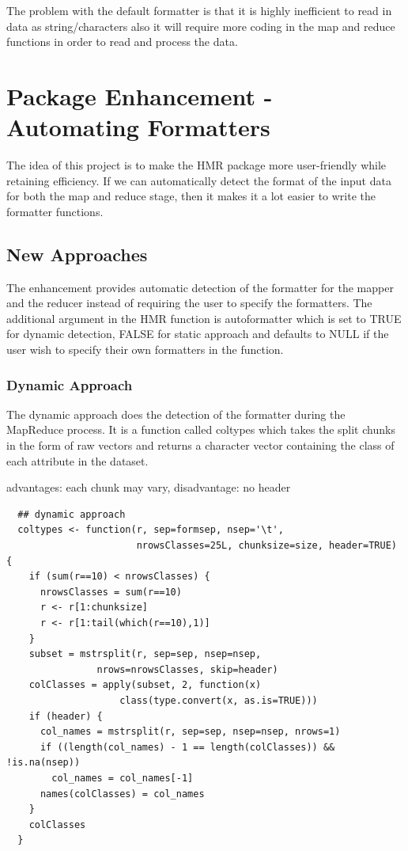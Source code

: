\documentclass[11pt]{book}
\begin{document}
The problem with the default formatter is that it is highly inefficient to read in data as string/characters also it will require more coding in the map and reduce functions in order to read and process the data. 



\chapter{Package Enhancement - Automating Formatters}

The idea of this project is to make the HMR package more user-friendly while retaining efficiency. If we can automatically detect the format of the input data for both the map and reduce stage, then it makes it a lot easier to write the formatter functions. 

\section{New Approaches}

The enhancement provides automatic detection of the formatter for the mapper and the reducer instead of requiring the user to specify the formatters. The additional argument in the HMR function is autoformatter which is set to TRUE for dynamic detection, FALSE for static approach and defaults to NULL if the user wish to specify their own formatters in the function.

\subsection{Dynamic Approach}

The dynamic approach does the detection of the formatter during the MapReduce process. It is a function called coltypes which takes the split chunks in the form of raw vectors and returns a character vector containing the class of each attribute in the dataset. 

advantages: each chunk may vary, 
disadvantage: no header

\begin{verbatim}
  ## dynamic approach
  coltypes <- function(r, sep=formsep, nsep='\t', 
                       nrowsClasses=25L, chunksize=size, header=TRUE) {
    if (sum(r==10) < nrowsClasses) {
      nrowsClasses = sum(r==10)
      r <- r[1:chunksize]
      r <- r[1:tail(which(r==10),1)]
    }
    subset = mstrsplit(r, sep=sep, nsep=nsep, 
    			nrows=nrowsClasses, skip=header)
    colClasses = apply(subset, 2, function(x) 
    				class(type.convert(x, as.is=TRUE)))
    if (header) {
      col_names = mstrsplit(r, sep=sep, nsep=nsep, nrows=1)
      if ((length(col_names) - 1 == length(colClasses)) && !is.na(nsep))
        col_names = col_names[-1]
      names(colClasses) = col_names
    }
    colClasses
  }
\end{verbatim}
\end{document}
